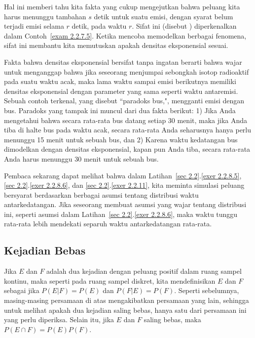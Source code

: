 \begin{example}
Hal ini memberi tahu kita fakta yang cukup mengejutkan bahwa peluang kita harus
menunggu tambahan $s$ detik untuk suatu emisi, dengan syarat belum terjadi emisi selama $r$ detik,
 pada waktu $r$.  Sifat ini (disebut ) diperkenalkan dalam Contoh~\ref{exam 2.2.7.5}. 
Ketika mencoba memodelkan berbagai fenomena, sifat ini membantu kita memutuskan apakah
densitas eksponensial sesuai.  
\par
Fakta bahwa densitas eksponensial bersifat tanpa ingatan berarti bahwa wajar untuk menganggap
bahwa jika seseorang menjumpai sebongkah isotop radioaktif pada suatu waktu acak, maka lama waktu
sampai emisi berikutnya memiliki densitas eksponensial dengan parameter yang sama seperti waktu
antaremisi.
Sebuah contoh terkenal, yang disebut ``paradoks bus,", mengganti
emisi dengan bus.  Paradoks yang tampak ini muncul dari dua fakta berikut:  1) Jika Anda mengetahui bahwa
secara rata-rata bus datang setiap 30 menit, maka jika Anda tiba di halte bus pada waktu acak,
secara rata-rata Anda seharusnya hanya perlu menunggu 15 menit untuk sebuah bus, dan 2) Karena waktu
kedatangan bus dimodelkan dengan densitas eksponensial, kapan pun Anda tiba,
secara rata-rata Anda harus menunggu 30 menit untuk sebuah bus.
\par
Pembaca sekarang dapat melihat bahwa dalam Latihan~\ref{sec 2.2}.\ref{exer 2.2.8.5}, 
\ref{sec 2.2}.\ref{exer 2.2.8.6}, dan \ref{sec 2.2}.\ref{exer
2.2.11}, kita meminta simulasi peluang bersyarat berdasarkan berbagai asumsi
tentang distribusi waktu antarkedatangan.  Jika seseorang membuat asumsi yang wajar tentang
distribusi ini, seperti asumsi dalam Latihan~\ref{sec 2.2}.\ref{exer 2.2.8.6}, maka waktu 
tunggu rata-rata lebih mendekati separuh waktu antarkedatangan rata-rata.
\end{example}

\subsection*{Kejadian Bebas}

Jika $E$ dan $F$ adalah dua kejadian dengan peluang positif dalam ruang sampel kontinu, maka seperti pada
ruang sampel diskret, kita mendefinisikan $E$ dan $F$ sebagai  jika 
$P(E|F) = P(E)$ dan $P(F|E) = P(F)$.  Seperti sebelumnya, masing-masing persamaan di atas mengakibatkan
persamaan yang lain, sehingga untuk melihat apakah dua kejadian saling bebas, hanya satu dari persamaan ini yang perlu
diperiksa.  Selain itu, jika $E$ dan $F$ saling bebas, maka $P(E \cap F) = P(E)P(F)$.

